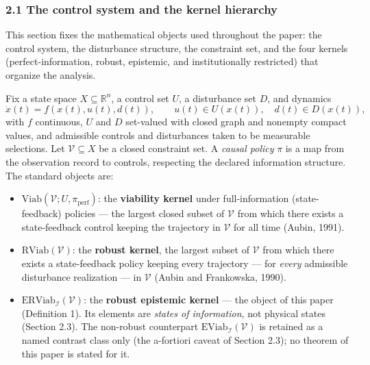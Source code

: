 \documentclass[11pt]{article}
\providecommand{\tightlist}{\setlength{\itemsep}{0pt}\setlength{\parskip}{0pt}}
\begin{document}
\subsubsection{2.1 The control system and the kernel
hierarchy}\label{the-control-system-and-the-kernel-hierarchy}

This section fixes the mathematical objects used throughout the paper:
the control system, the disturbance structure, the constraint set, and
the four kernels (perfect-information, robust, epistemic, and
institutionally restricted) that organize the analysis.

Fix a state space \(X \subseteq \mathbb{R}^n\), a control set \(U\), a
disturbance set \(D\), and dynamics
\[\dot x(t) = f(x(t), u(t), d(t)), \qquad u(t) \in U(x(t)), \quad d(t) \in D(x(t)),\]
with \(f\) continuous, \(U\) and \(D\) set-valued with closed graph and
nonempty compact values, and admissible controls and disturbances taken
to be measurable selections. Let \(\mathcal{V} \subseteq X\) be a closed
constraint set. A \emph{causal policy} \(\pi\) is a map from the
observation record to controls, respecting the declared information
structure. The standard objects are:

\begin{itemize}
\tightlist
\item
  \(\mathrm{Viab}(\mathcal{V}; U, \pi_{\mathrm{perf}})\): the
  \textbf{viability kernel} under full-information (state-feedback)
  policies --- the largest closed subset of \(\mathcal{V}\) from which
  there exists a state-feedback control keeping the trajectory in
  \(\mathcal{V}\) for all time (Aubin, 1991).
\item
  \(\mathrm{RViab}(\mathcal{V})\): the \textbf{robust kernel}, the
  largest subset of \(\mathcal{V}\) from which there exists a
  state-feedback policy keeping every trajectory --- for \emph{every}
  admissible disturbance realization --- in \(\mathcal{V}\) (Aubin and
  Frankowska, 1990).
\item
  \(\mathrm{ERViab}_{\mathcal{I}}(\mathcal{V})\): the \textbf{robust
  epistemic kernel} --- the object of this paper (Definition 1). Its
  elements are \emph{states of information}, not physical states
  (Section 2.3). The non-robust counterpart
  \(\mathrm{EViab}_{\mathcal{I}}(\mathcal{V})\) is retained as a named
  contrast class only (the a-fortiori caveat of Section 2.3); no theorem
  of this paper is stated for it.
\end{itemize}
\end{document}
